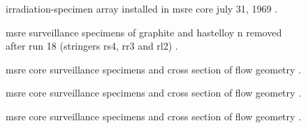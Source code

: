 \documentclass[ms,a4paper]{memoir}
\newcommand*{\mrsarchive}{../../msr-archive}%
\begin{document}
\begin{figure}[H]
  \centering
  \centering
  \caption{irradiation-specimen array installed in msre core july 31, 1969 \parencite[figure 1.13]{ornl-4449}.}
\end{figure}

\begin{figure}[H]
  \centering
  \centering
  \caption{msre surveillance specimens of graphite and hastelloy n removed after run 18 (stringers rs4, rr3 and rl2) \parencite[figure 16.1]{ornl-4449}.}
\end{figure}

\begin{figure}[H]
  \centering
  \centering
  \caption{msre core surveillance specimens and cross section of flow geometry \parencite[figure 2.4]{ornl-tm-3884}.}
\end{figure}

\begin{figure}[H]
  \centering
  \centering
  \caption{msre core surveillance specimens and cross section of flow geometry \parencite[figure 4.6]{ornl-3872}.}
\end{figure}

\begin{figure}[H]
  \centering
  \centering
  \caption{msre core surveillance specimens and cross section of flow geometry \parencite[figure 9.4]{ornl-4865}.}
\end{figure}

\end{document}

